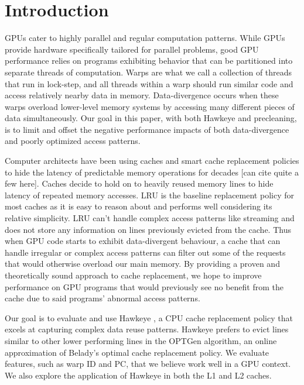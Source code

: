 \chapter{Introduction}

GPUs cater to highly parallel and regular computation patterns. While GPUs provide hardware specifically tailored for parallel problems, good GPU performance relies on programs exhibiting behavior that can be partitioned into separate threads of computation. Warps are what we call a collection of threads that run in lock-step, and all threads within a warp should run similar code and access relatively nearby data in memory. Data-divergence occurs when these warps overload lower-level memory systems by accessing many different pieces of data simultaneously. Our goal in this paper, with both Hawkeye and precleaning, is to limit and offset the negative performance impacts of both data-divergence and poorly optimized access patterns.

Computer architects have been using caches and smart cache replacement policies to hide the latency of predictable memory operations for decades \cite{deadblock,lruperf,cache_burst,dip,eva,rrip} [can cite quite a few here]. Caches decide to hold on to heavily reused memory lines to hide latency of repeated memory accesses. LRU is the baseline replacement policy for most caches as it is easy to reason about and performs well considering its relative simplicity. LRU can’t handle complex access patterns like streaming and does not store any information on lines previously evicted from the cache. Thus when GPU code starts to exhibit data-divergent behaviour, a cache that can handle irregular or complex access patterns can filter out some of the requests that would otherwise overload our main memory. By providing a proven and theoretically sound approach to cache replacement, we hope to improve performance on GPU programs that would previously see no benefit from the cache due to said programs’ abnormal access patterns.

Our goal is to evaluate and use Hawkeye \cite{hawkeye}, a CPU cache replacement policy that excels at capturing complex data reuse patterns. Hawkeye prefers to evict lines similar to other lower performing lines in the OPTGen algorithm, an online approximation of Belady’s optimal cache replacement policy. We evaluate features, such as warp ID and PC, that we believe work well in a GPU context. We also explore the application of Hawkeye in both the L1 and L2 caches.

